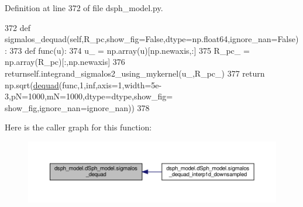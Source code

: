 Definition at line 372 of file dsph\+\_\+model.\+py.


\begin{DoxyCode}
372     \textcolor{keyword}{def }sigmalos\_dequad(self,R\_pc,show\_fig=False,dtype=np.float64,ignore\_nan=False):
373         \textcolor{keyword}{def }func(u):
374             u\_ = np.array(u)[np.newaxis,:]
375             R\_pc\_ = np.array(R\_pc)[:,np.newaxis]
376             returnself.integrand\_sigmalos2\_using\_mykernel(u\_,R\_pc\_)
377         \textcolor{keywordflow}{return} np.sqrt(\hyperlink{namespacedequad}{dequad}(func,1,inf,axis=1,width=5e-3,pN=1000,mN=1000,dtype=dtype,show\_fig=
      show\_fig,ignore\_nan=ignore\_nan))
378     
\end{DoxyCode}
Here is the caller graph for this function\+:
\nopagebreak
\begin{figure}[H]
\begin{center}
\leavevmode
\includegraphics[width=350pt]{d0/d25/classdsph__model_1_1dSph__model_a5b73e854e8ac1b1c6a467498cd181e7a_icgraph}
\end{center}
\end{figure}
\mbox{\label{classdsph__model_1_1dSph__model_a0046cd7677792835d8cfafe83dbe276c}} 
